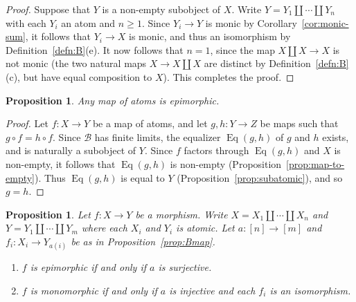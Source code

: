 \documentclass[12pt]{amsart}
\numberwithin{equation}{section}
\newtheorem{proposition}[equation]{Proposition}
\theoremstyle{definition}
\newcommand{\cB}{\mathcal{B}}
\DeclareMathOperator{\Eq}{Eq}
\begin{document}
\begin{proof}
Suppose that $Y$ is a non-empty subobject of $X$. Write $Y=Y_1 \amalg \cdots \amalg Y_n$ with each $Y_i$ an atom and $n \ge 1$. Since $Y_i \to Y$ is monic by Corollary~\ref{cor:monic-sum}, it follows that $Y_i \to X$ is monic, and thus an isomorphism by Definition~\ref{defn:B}(e). It now follows that $n=1$, since the map $X \amalg X \to X$ is not monic (the two natural maps $X \to X \amalg X$ are distinct by Definition~\ref{defn:B}(c), but have equal composition to $X$). This completes the proof.
\end{proof}

\begin{proposition} \label{prop:epicatom}
Any map of atoms is epimorphic.
\end{proposition}

\begin{proof}
Let $f \colon X \to Y$ be a map of atoms, and let $g,h \colon Y \to Z$ be maps such that $g \circ f=h \circ f$. Since $\cB$ has finite limits, the equalizer $\Eq(g,h)$ of $g$ and $h$ exists, and is naturally a subobject of $Y$. Since $f$ factors through $\Eq(g,h)$ and $X$ is non-empty, it follows that $\Eq(g,h)$ is non-empty (Proposition~\ref{prop:map-to-empty}). Thus $\Eq(g,h)$ is equal to $Y$ (Proposition~\ref{prop:subatomic}), and so $g=h$.
\end{proof}

\begin{proposition} \label{prop:Bmonic}
Let $f \colon X \to Y$ be a morphism. Write $X=X_1 \amalg \cdots \amalg X_n$ and $Y=Y_1 \amalg \cdots \amalg Y_m$ where each $X_i$ and $Y_i$ is atomic. Let $a \colon [n] \to [m]$ and $f_i \colon X_i \to Y_{a(i)}$ be as in Proposition~\ref{prop:Bmap}.
\begin{enumerate}
\item $f$ is epimorphic if and only if $a$ is surjective.
\item $f$ is monomorphic if and only if $a$ is injective and each $f_i$ is an isomorphism.
\end{enumerate}
\end{proposition}
\end{document}
